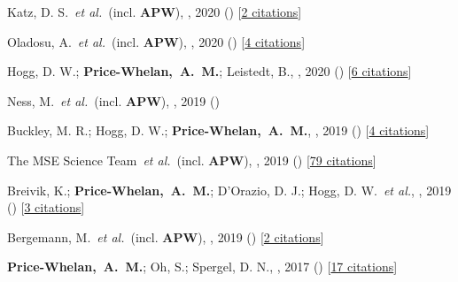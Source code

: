 \item[{\color{deemph}\scriptsize9}]Katz, D. S.~\textit{et al.}~(incl. \textbf{APW}), , 2020 () [\href{http://adsabs.harvard.edu/abs/2020arXiv201005102K}{2 citations}]

\item[{\color{deemph}\scriptsize8}]Oladosu, A.~\textit{et al.}~(incl. \textbf{APW}), , 2020 () [\href{http://adsabs.harvard.edu/abs/2020arXiv200704459O}{4 citations}]

\item[{\color{deemph}\scriptsize7}]Hogg, D. W.; \textbf{Price-Whelan,~A.~M.}; Leistedt, B., , 2020 () [\href{http://adsabs.harvard.edu/abs/2020arXiv200514199H}{6 citations}]

\item[{\color{deemph}\scriptsize6}]Ness, M.~\textit{et al.}~(incl. \textbf{APW}), , 2019 ()

\item[{\color{deemph}\scriptsize5}]Buckley, M. R.; Hogg, D. W.; \textbf{Price-Whelan,~A.~M.}, , 2019 () [\href{http://adsabs.harvard.edu/abs/2019arXiv190700987B}{4 citations}]

\item[{\color{deemph}\scriptsize4}]The MSE Science Team~\textit{et al.}~(incl. \textbf{APW}), , 2019 () [\href{http://adsabs.harvard.edu/abs/2019arXiv190404907T}{79 citations}]

\item[{\color{deemph}\scriptsize3}]Breivik, K.; \textbf{Price-Whelan,~A.~M.}; D'Orazio, D. J.; Hogg, D. W.~\textit{et al.}, , 2019 () [\href{http://adsabs.harvard.edu/abs/2019arXiv190305094B}{3 citations}]

\item[{\color{deemph}\scriptsize2}]Bergemann, M.~\textit{et al.}~(incl. \textbf{APW}), , 2019 () [\href{http://adsabs.harvard.edu/abs/2019arXiv190303157B}{2 citations}]

\item[{\color{deemph}\scriptsize1}]\textbf{Price-Whelan,~A.~M.}; Oh, S.; Spergel, D. N., , 2017 () [\href{http://adsabs.harvard.edu/abs/2017arXiv170903532P}{17 citations}]